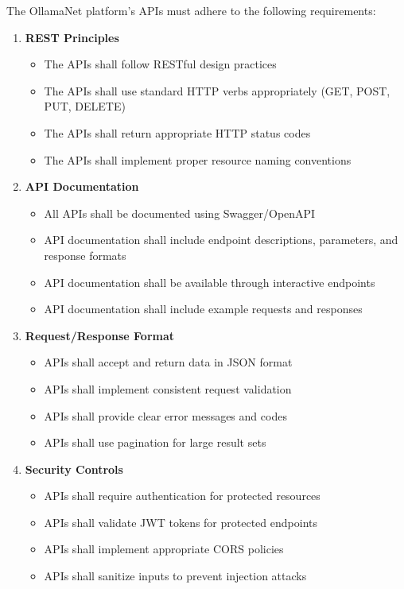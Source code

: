 The OllamaNet platform's APIs must adhere to the following requirements:

\begin{enumerate}
   \item \textbf{REST Principles}
   \begin{itemize}
      \item The APIs shall follow RESTful design practices
      \item The APIs shall use standard HTTP verbs appropriately (GET, POST, PUT, DELETE)
      \item The APIs shall return appropriate HTTP status codes
      \item The APIs shall implement proper resource naming conventions
   \end{itemize}

   \item \textbf{API Documentation}
   \begin{itemize}
      \item All APIs shall be documented using Swagger/OpenAPI
      \item API documentation shall include endpoint descriptions, parameters, and response formats
      \item API documentation shall be available through interactive endpoints
      \item API documentation shall include example requests and responses
   \end{itemize}

   \item \textbf{Request/Response Format}
   \begin{itemize}
      \item APIs shall accept and return data in JSON format
      \item APIs shall implement consistent request validation
      \item APIs shall provide clear error messages and codes
      \item APIs shall use pagination for large result sets
   \end{itemize}

   \item \textbf{Security Controls}
   \begin{itemize}
      \item APIs shall require authentication for protected resources
      \item APIs shall validate JWT tokens for protected endpoints
      \item APIs shall implement appropriate CORS policies
      \item APIs shall sanitize inputs to prevent injection attacks
   \end{itemize}


\end{enumerate}

